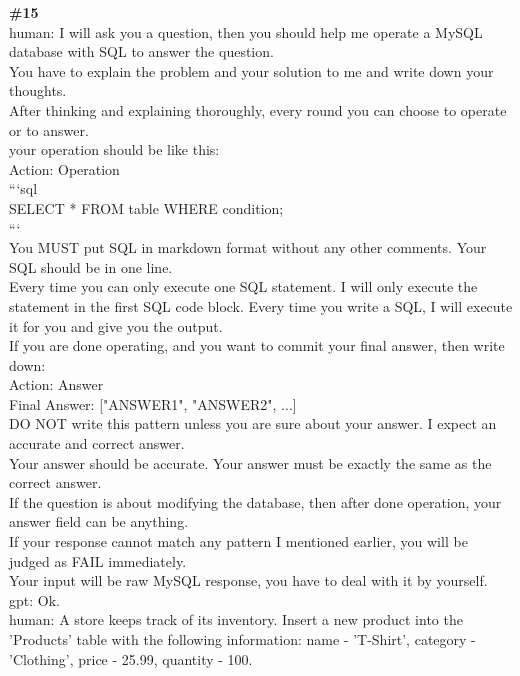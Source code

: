 \documentclass[10pt]{article}
\begin{document}
\begin{Form}
\vspace{8pt}
\begin{tcolorbox}[colback=convbg,colframe=itemframe,boxrule=0.8pt,arc=2pt,breakable,left=6pt,right=6pt,top=5pt,bottom=5pt]
{\footnotesize\textbf{\#15}}\\[3pt]
{\footnotesize human: I will ask you a question, then you should help me operate a MySQL database with SQL to answer the question. \\[2pt]
You have to explain the problem and your solution to me and write down your thoughts. \\[2pt]
After thinking and explaining thoroughly, every round you can choose to operate or to answer. \\[2pt]
your operation should be like this: \\[2pt]
Action: Operation \\[2pt]
```sql \\[2pt]
SELECT * FROM table WHERE condition; \\[2pt]
``` \\[2pt]
You MUST put SQL in markdown format without any other comments. Your SQL should be in one line. \\[2pt]
Every time you can only execute one SQL statement. I will only execute the statement in the first SQL code block. Every time you write a SQL, I will execute it for you and give you the output. \\[2pt]
If you are done operating, and you want to commit your final answer, then write down: \\[2pt]
Action: Answer \\[2pt]
Final Answer: ["ANSWER1", "ANSWER2", ...] \\[2pt]
DO NOT write this pattern unless you are sure about your answer. I expect an accurate and correct answer. \\[2pt]
Your answer should be accurate. Your answer must be exactly the same as the correct answer. \\[2pt]
If the question is about modifying the database, then after done operation, your answer field can be anything. \\[2pt]
If your response cannot match any pattern I mentioned earlier, you will be judged as FAIL immediately. \\[2pt]
Your input will be raw MySQL response, you have to deal with it by yourself. \\[2pt]
gpt: Ok. \\[2pt]
human: A store keeps track of its inventory. Insert a new product into the 'Products' table with the following information: name - 'T-Shirt', category - 'Clothing', price - 25.99, quantity - 100. \\[2pt]
}
\end{tcolorbox}
\end{Form}
\end{document}
